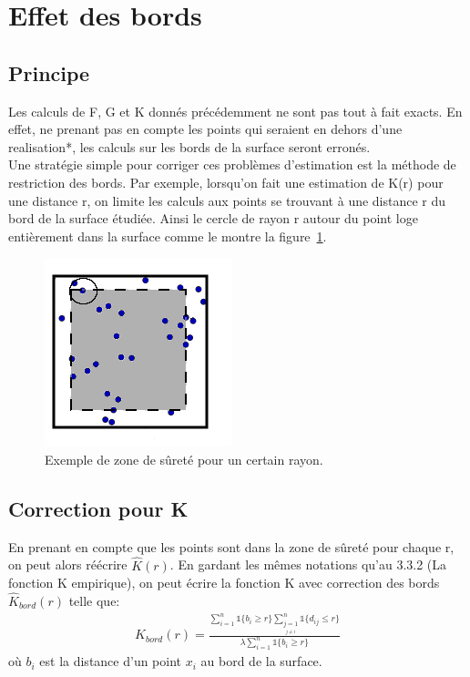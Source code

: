 \documentclass[stage2a]{tnreport}
\begin{document}

\section{Effet des bords}

\subsection{Principe}
Les calculs de F, G et K donnés précédemment ne sont pas tout à fait exacts. En effet, ne prenant pas en compte les points qui seraient en dehors d'une \gls{realisation}*, les calculs sur les bords de la surface seront erronés.\\
Une stratégie simple pour corriger ces problèmes d'estimation est la méthode de restriction des bords. Par exemple, lorsqu'on fait une estimation de K(r) pour une distance r, on limite les calculs aux points se trouvant à une distance r du bord de la surface étudiée. Ainsi le cercle de rayon r autour du point loge entièrement dans la surface comme le montre la figure~\ref{fig:bords}.

\begin{figure}[h]
  \centering
  \includegraphics[scale=0.5]{figures/bords2.png}
  \caption{Exemple de zone de sûreté pour un certain rayon.}
  \label{fig:bords}
\end{figure}


\subsection{Correction pour K}

En prenant en compte que les points sont dans la zone de sûreté pour chaque r, on peut alors réécrire \begin{math} \hat{K}(r) \end{math}. En gardant les mêmes notations qu'au 3.3.2 (La fonction K empirique), on peut écrire la fonction K avec correction des bords \begin{math} \hat{K}_{bord}(r) \end{math} telle que:
\begin{align*}
\hat{K}_{bord}(r) = \frac{  \sum_{i=1}^n \mathds{1} \{b_i \geq r \} \sum_{\underset{j \neq i}{j=1}}^n \mathds{1} \{d_{ij} \leq r \}}{\lambda \sum_{i=1}^n \mathds{1} \{b_i \geq r \}}
\end{align*}
où \begin{math}b_i\end{math} est la distance d'un point \begin{math}x_i\end{math} au bord de la surface.
\end{document}
